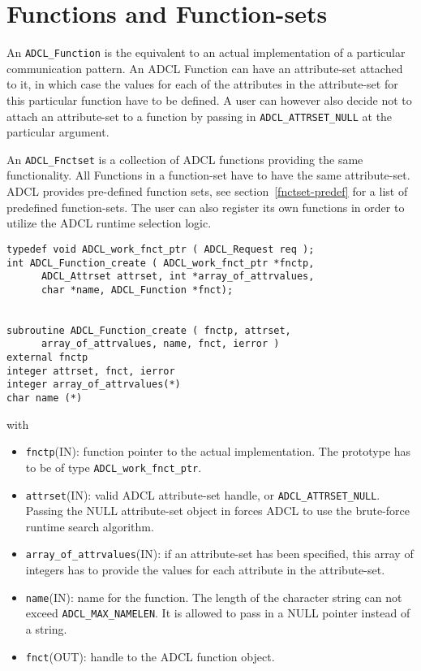 \section{Functions and Function-sets}

An {\tt ADCL\_Function} is the equivalent to an actual implementation of a
particular communication pattern. An ADCL Function can have an attribute-set
attached to it, in which case the values for each of the attributes in the
attribute-set for this particular function have to be defined. A user can
however also decide not to attach an attribute-set to a function by passing in
{\tt ADCL\_ATTRSET\_NULL} at the particular argument.

An {\tt ADCL\_Fnctset} is a collection of ADCL functions providing the same
functionality. All Functions in a function-set have to have the same
attribute-set. ADCL provides pre-defined function sets, see
section~\ref{fnctset-predef} for a list of predefined function-sets. The user
can also register its own functions in order to utilize the ADCL runtime
selection logic.

\begin{verbatim}
typedef void ADCL_work_fnct_ptr ( ADCL_Request req );
int ADCL_Function_create ( ADCL_work_fnct_ptr *fnctp, 
      ADCL_Attrset attrset, int *array_of_attrvalues,  
      char *name, ADCL_Function *fnct);


subroutine ADCL_Function_create ( fnctp, attrset, 
      array_of_attrvalues, name, fnct, ierror )
external fnctp
integer attrset, fnct, ierror
integer array_of_attrvalues(*)
char name (*)	                                

\end{verbatim}
with
\begin{itemize}
\item {\tt fnctp}(IN): function pointer to the actual implementation. The prototype has
     to be of type {\tt ADCL\_work\_fnct\_ptr}.
\item {\tt attrset}(IN): valid ADCL attribute-set handle, or {\tt ADCL\_ATTRSET\_NULL}. Passing the NULL attribute-set 
   object in forces ADCL to use the brute-force runtime search algorithm.
\item {\tt array\_of\_attrvalues}(IN): if an attribute-set has been specified, this array of
 integers has to provide the values for each attribute in the attribute-set. 
\item {\tt name}(IN): name for the function. The length of the character string can not exceed 
   {\tt ADCL\_MAX\_NAMELEN}. It is allowed to pass in a NULL pointer instead of a string.
\item {\tt fnct}(OUT): handle to the ADCL function object.
\end{itemize}

